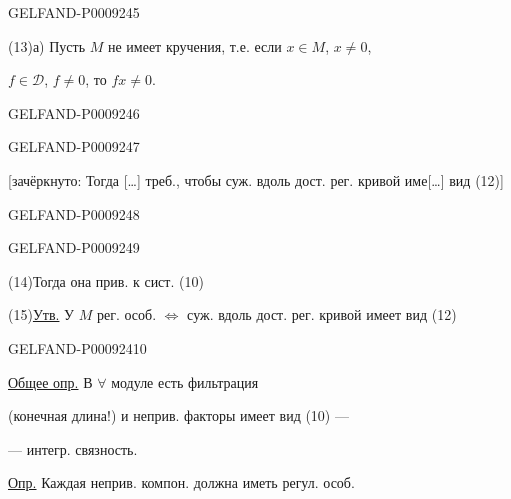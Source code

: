 \begin{GelfandAdjacentEvidence}{GELFAND-P000924}{5}


(13)\quad а) Пусть $M$ не имеет кручения, т.е. если $x\in M$, $x\ne0$,

$f\in\mathcal D$, $f\ne0$, то $fx\ne0$.
\end{GelfandAdjacentEvidence}
\begin{GelfandAdjacentEvidence}{GELFAND-P000924}{6}

\end{GelfandAdjacentEvidence}
\begin{GelfandAdjacentEvidence}{GELFAND-P000924}{7}


[зачёркнуто: Тогда […] треб., чтобы суж. вдоль дост. рег. кривой име[…] вид (12)]
\end{GelfandAdjacentEvidence}
\begin{GelfandAdjacentEvidence}{GELFAND-P000924}{8}

\end{GelfandAdjacentEvidence}
\begin{GelfandAdjacentEvidence}{GELFAND-P000924}{9}


(14)\quad Тогда она прив. к сист. (10)

(15)\quad \underline{Утв.} У $M$ рег. особ. $\Longleftrightarrow$ суж. вдоль дост. рег. кривой имеет вид (12)
\end{GelfandAdjacentEvidence}
\begin{GelfandAdjacentEvidence}{GELFAND-P000924}{10}


\underline{Общее опр.} В $\forall$ модуле есть фильтрация

(конечная длина!) и неприв. факторы имеет вид (10) ---

--- интегр. связность.
\end{GelfandAdjacentEvidence}


\underline{Опр.} Каждая неприв. компон. должна иметь регул. особ.


